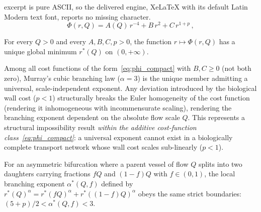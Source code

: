 \documentclass[10pt,a4paper]{amsart}
\begin{document}
excerpt is pure ASCII, so the delivered engine, XeLaTeX with its default Latin Modern text font, reports no missing character.
\begin{equation}
  \Phi(r,Q) = A(Q)\,r^{-4} + B\,r^2 + C\,r^{1+p}\,,
  \label{eq:phi_compact}
\end{equation}

\begin{theorem}
\label{thm:unique}
For every $Q>0$ and every $A,B,C,p>0$, the function $r\mapsto\Phi(r,Q)$
has a unique global minimum $r^*(Q)$ on $(0,+\infty)$.
\end{theorem}

\begin{corollary}
\label{cor:murray_uniqueness}
Among all cost functions of the form~\eqref{eq:phi_compact} with $B,C\geq0$ (not
both zero), Murray's cubic branching law ($\alpha=3$) is the unique member
admitting a universal, scale-independent exponent. Any deviation introduced by
the biological wall cost ($p<1$) structurally breaks the Euler homogeneity of
the cost function (rendering it inhomogeneous with incommensurate scaling),
rendering the branching exponent dependent on the absolute flow scale $Q$. This
represents a structural impossibility result \emph{within the
additive cost-function class~\eqref{eq:phi_compact}}: a universal
exponent cannot exist in a biologically complete transport network
whose wall cost scales sub-linearly ($p < 1$).
\end{corollary}

\begin{corollary}
\label{cor:asym}
For an asymmetric bifurcation where a parent vessel of flow $Q$ splits into two
daughters carrying fractions $fQ$ and $(1-f)Q$ with $f \in (0,1)$, the local
branching exponent $\alpha^*(Q,f)$ defined by $r^*(Q)^{\alpha} =
r^*(fQ)^{\alpha} + r^*((1-f)Q)^{\alpha}$ obeys the same strict boundaries:
$(5+p)/2 < \alpha^*(Q,f) < 3$.
\end{corollary}
\end{document}
